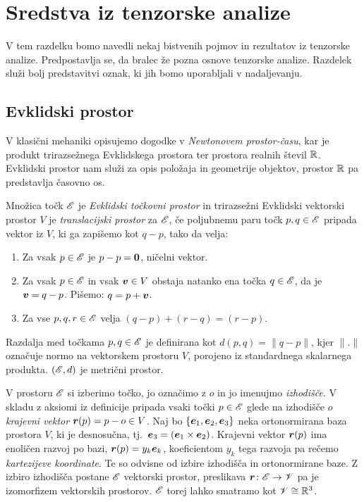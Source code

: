 \chapter{Sredstva iz tenzorske analize}


V tem razdelku bomo navedli nekaj bistvenih pojmov in rezultatov iz tenzorske analize. Predpostavlja
se, da bralec že pozna osnove tenzorske analize. Razdelek služi bolj predstavitvi oznak, ki jih
bomo uporabljali v nadaljevanju.


\section{Evklidski prostor}


V klasični mehaniki opisujemo dogodke v \emph{Newtonovem prostor-času}, kar je produkt
trirazsežnega Evklidskega prostora ter prostora realnih števil $\mathbb R$. Evklidski prostor nam služi
za opis položaja in geometrije objektov, prostor $\mathbb R$ pa predstavlja časovno os.

\begin{definicija} \label{d:ep}
	Množica točk $\mathscr E$ je \emph{Evklidski točkovni prostor} in trirazsežni Evklidski vektorski prostor $V$ je
	\emph{translacijski prostor} za $\mathscr E$, če poljubnemu paru točk $p,q\in\mathscr E$ pripada vektor iz $V$,
	ki ga zapišemo kot $q-p$, tako da velja:
	\begin{enumerate}
		\item Za vsak $p\in\mathscr E$ je $p-p=\boldsymbol 0$, ničelni vektor.
		\item Za vsak $p\in\mathscr E$ in vsak $\boldsymbol v\in V$ obstaja natanko ena točka $q\in\mathscr E$, da je
		$\boldsymbol v=q-p$. Pišemo: $q=p+\boldsymbol v$.
		\item Za vse $p,q,r\in\mathscr E$ velja $(q-p)+(r-q)=(r-p)$.
	\end{enumerate}
\end{definicija}

Razdalja med točkama $p,q\in\mathscr E$ je definirana kot $d(p,q)=\|q-p\|$, kjer $\|.\|$ označuje normo na
vektorskem prostoru $V$, porojeno iz standardnega skalarnega produkta. $(\mathscr E,d)$ je metrični prostor.

V prostoru $\mathscr E$ si izberimo točko, jo označimo z $o$ in jo imenujmo \emph{izhodišče}.
V skladu z aksiomi iz definicije pripada vsaki točki $p\in\mathscr E$ glede na izhodišče $o$ \emph{krajevni vektor}
$\boldsymbol r(p)=p-o\in V$. Naj bo $\{\boldsymbol e_1,\boldsymbol e_2,\boldsymbol e_3\}$ neka ortonormirana baza prostora $V$,
ki je desnosučna, tj.~$\boldsymbol e_3=(\boldsymbol e_1\times\boldsymbol e_2)$. Krajevni vektor $\boldsymbol r(p)$
ima enoličen razvoj po bazi, $\boldsymbol r(p)=y_k\boldsymbol e_k$, koeficientom $y_k$ tega razvoja pa rečemo
\emph{kartezijeve koordinate}. Te so odvisne od izbire izhodišča in ortonormirane baze.
Z izbiro izhodišča postane $\mathscr E$ vektorski prostor, preslikava $\boldsymbol r\colon\mathscr E\to\mathscr V$ pa je izomorfizem
vektorskih prostorov. $\mathscr E$ torej lahko smatramo kot $\mathscr V\cong\mathbb R^3$.

